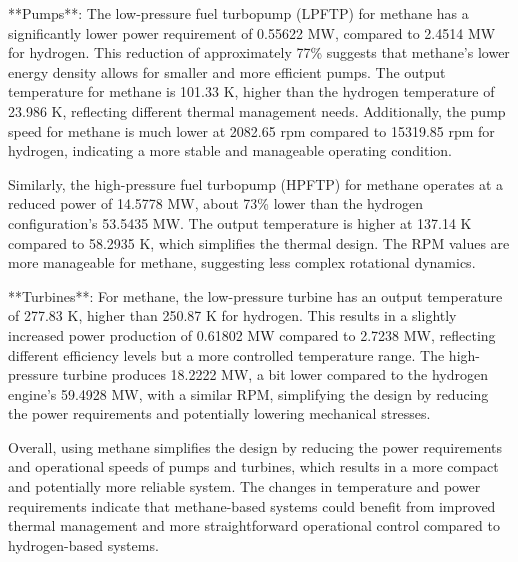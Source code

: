 **Pumps**: The low-pressure fuel turbopump (LPFTP) for methane has a significantly lower power requirement of 0.55622 MW, compared to 2.4514 MW for hydrogen. This reduction of approximately 77\% suggests that methane's lower energy density allows for smaller and more efficient pumps. The output temperature for methane is 101.33 K, higher than the hydrogen temperature of 23.986 K, reflecting different thermal management needs. Additionally, the pump speed for methane is much lower at 2082.65 rpm compared to 15319.85 rpm for hydrogen, indicating a more stable and manageable operating condition.

Similarly, the high-pressure fuel turbopump (HPFTP) for methane operates at a reduced power of 14.5778 MW, about 73\% lower than the hydrogen configuration's 53.5435 MW. The output temperature is higher at 137.14 K compared to 58.2935 K, which simplifies the thermal design. The RPM values are more manageable for methane, suggesting less complex rotational dynamics.

**Turbines**: For methane, the low-pressure turbine has an output temperature of 277.83 K, higher than 250.87 K for hydrogen. This results in a slightly increased power production of 0.61802 MW compared to 2.7238 MW, reflecting different efficiency levels but a more controlled temperature range. The high-pressure turbine produces 18.2222 MW, a bit lower compared to the hydrogen engine’s 59.4928 MW, with a similar RPM, simplifying the design by reducing the power requirements and potentially lowering mechanical stresses.

Overall, using methane simplifies the design by reducing the power requirements and operational speeds of pumps and turbines, which results in a more compact and potentially more reliable system. The changes in temperature and power requirements indicate that methane-based systems could benefit from improved thermal management and more straightforward operational control compared to hydrogen-based systems.

